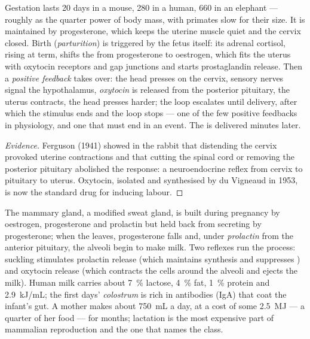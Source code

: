\begin{proposition}\label{prop:b2:mammal-reproduction:birth}
Gestation lasts \num{20} days in a mouse, \num{280} in a human, \num{660}
in an elephant --- roughly as the quarter power of body mass, with
primates slow for their size. It is maintained by progesterone,
which keeps the uterine muscle quiet and the cervix closed. Birth
(\emph{parturition}) is triggered by the fetus itself: its adrenal
cortisol, rising at term, shifts the  from progesterone to
oestrogen, which fits the uterus with oxytocin receptors and gap
junctions and starts prostaglandin release. Then a \emph{positive
feedback} takes over: the head presses on the cervix, sensory
nerves signal the hypothalamus, \emph{oxytocin} is released from the
posterior pituitary, the uterus contracts, the head presses harder;
the loop escalates until delivery, after which the stimulus ends
and the loop stops --- one of the few positive feedbacks in
physiology, and one that must end in an event. The  is
delivered minutes later.
\end{proposition}
\begin{proof}[Evidence]
Ferguson (1941) showed in the rabbit that distending the cervix
provoked uterine contractions and that cutting the spinal cord or
removing the posterior pituitary abolished the response: a
neuroendocrine reflex from cervix to pituitary to uterus. Oxytocin,
isolated and synthesised by du Vigneaud in 1953, is now the standard
drug for inducing labour.
\end{proof}

\begin{proposition}[Lactation]\label{prop:b2:mammal-reproduction:lactation}
The mammary gland, a modified sweat gland, is built during pregnancy
by oestrogen, progesterone and prolactin but held back from
secreting by progesterone; when the  leaves, progesterone
falls and, under \emph{prolactin} from the anterior pituitary, the
alveoli begin to make milk. Two reflexes run the process: suckling
stimulates prolactin release (which maintains synthesis and
suppresses ) and oxytocin release (which contracts the
cells around the alveoli and ejects the milk). Human milk carries
about \qty{7}{\%} lactose, \qty{4}{\%} fat, \qty{1}{\%} protein and
\qty{2.9}{kJ/mL}; the first days' \emph{colostrum} is rich in
antibodies (IgA) that coat the infant's gut. A mother makes about
\qty{750}{mL} a day, at a cost of some \qty{2.5}{MJ} --- a quarter of
her food --- for months; lactation is the most expensive part of
mammalian reproduction and the one that names the class.
\end{proposition}


